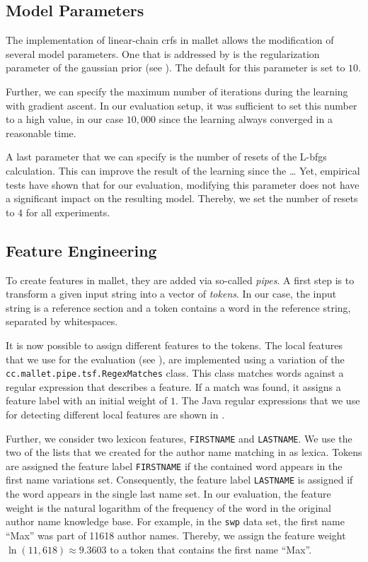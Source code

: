 \subsection{Model Parameters}\label{subsec:i-model-parameters}

The implementation of \glspl{linear-chain crf} in \gls{mallet} allows the modification of several model parameters.
One that is addressed by  is the regularization parameter of the \gls{gaussian prior} (see ).
The default for this parameter is set to $10$.

Further, we can specify the maximum number of iterations during the learning with gradient ascent.
In our evaluation setup, it was sufficient to set this number to a high value, in our case $10,000$ since the learning always converged in a reasonable time.

A last parameter that we can specify is the number of resets of the L-\gls{bfgs} calculation.
This can improve the result of the learning since the \dots{}
Yet, empirical tests have shown that for our evaluation, modifying this parameter does not have a significant impact on the resulting model.
Thereby, we set the number of resets to $4$ for all experiments.

\subsection{Feature Engineering}\label{subsec:i-feature-engineering}

To create features in \gls{mallet}, they are added via so-called \textit{pipes}.
A first step is to transform a given input string into a vector of \textit{tokens}.
In our case, the input string is a reference section and a token contains a word in the reference string, separated by whitespaces.

It is now possible to assign different features to the tokens.
The local features that we use for the evaluation (see ), are implemented using a variation of the \texttt{cc.mallet.pipe.tsf.RegexMatches} class.
This class matches words against a regular expression that describes a feature.
If a match was found, it assigns a feature label with an initial weight of $1$.
The Java regular expressions that we use for detecting different local features are shown in .

Further, we consider two lexicon features, \texttt{FIRSTNAME} and \texttt{LASTNAME}.
We use the two of the lists that we created for the author name matching in  as lexica.
Tokens are assigned the feature label \texttt{FIRSTNAME} if the contained word appears in the first name variations set.
  Consequently, the feature label \texttt{LASTNAME} is assigned if the word appears in the single last name set.
In our evaluation, the feature weight is the natural logarithm of the frequency of the word in the original author name knowledge base.
For example, in the \texttt{swp} data set, the first name ``Max'' was part of \num{11618} author names.
Thereby, we assign the feature weight $\ln(11,618)\approx9.3603$ to a token that contains the first name ``Max''.

